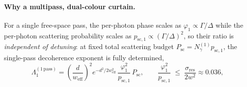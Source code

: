 \documentclass[11pt,a4paper]{article}
\begin{document}
\paragraph{Why a multipass, dual-colour curtain.} For a single free-space pass, the per-photon phase scales as $\varphi_1 \propto \Gamma/\Delta$ while the per-photon scattering probability scales as $p_{\text{sc},1} \propto (\Gamma/\Delta)^2$, so their ratio is \emph{independent of detuning}: at fixed total scattering budget $P_\text{sc} = N_\gamma^{(1)} p_{\text{sc},1}$, the single-pass decoherence exponent is fully determined,
\begin{equation}
\Lambda_1^{(1\,\text{pass})} = \left(\frac{d}{w_\text{eff}}\right)^2 e^{-d^2/2w_\text{eff}^2}\,\frac{\varphi_1^2}{p_{\text{sc},1}}\,P_\text{sc},
\qquad \frac{\varphi_1^2}{p_{\text{sc},1}} \;\le\; \frac{\sigma_\text{res}}{2w^2} \approx 0.036,
\label{eq:freespace_ceiling}
\end{equation}
\end{document}
